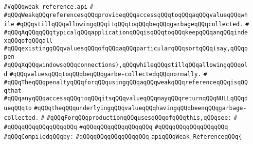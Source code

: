 \label{src/lib/std/src/nj/weak-reference.api}
\verb|##qQQqweak-reference.api|\newline
\verb|#|\newline
\verb|#qQQqWeakqQQqreferencesqQQqprovideqQQqaccessqQQqtoqQQqaqQQqvalueqQQqwhile|\newline
\verb|#qQQqstillqQQqallowingqQQqitqQQqtoqQQqbeqQQqgarbageqQQqcollected.|\newline
\verb|#|\newline
\verb|#qQQqAqQQqqQQqtypicalqQQqapplicationqQQqisqQQqtoqQQqkeepqQQqanqQQqindexqQQqofqQQqall|\newline
\verb|#qQQqexistingqQQqvaluesqQQqofqQQqaqQQqparticularqQQqsortqQQq(say,qQQqopen|\newline
\verb|#qQQqXqQQqwindowsqQQqconnections),qQQqwhileqQQqstillqQQqallowingqQQqold|\newline
\verb|#qQQqvaluesqQQqtoqQQqbeqQQqgarbe-collectedqQQqnormally.|\newline
\verb|#|\newline
\verb|#qQQqTheqQQqpenaltyqQQqforqQQqusingqQQqaqQQqweakqQQqreferenceqQQqisqQQqthat|\newline
\verb|#qQQqanyqQQqaccessqQQqtoqQQqitsqQQqvalueqQQqmayqQQqreturnqQQqNULLqQQqdueqQQqto|\newline
\verb|#qQQqtheqQQqunderlyingqQQqvalueqQQqhavingqQQqbeenqQQqgarbage-collected.|\newline
\verb|#|\newline
\verb|#qQQqForqQQqproductionqQQqusesqQQqofqQQqthis,qQQqsee:|\newline
\verb|#|\newline
\verb|#qQQqqQQqqQQqqQQqqQQq|\newline
\verb|#qQQqqQQqqQQqqQQqqQQq|\newline
\verb|#qQQqqQQqqQQqqQQqqQQq|\newline
\newline
\verb|#qQQqCompiledqQQqby:|\newline
\verb|#qQQqqQQqqQQqqQQqqQQq|\newline
\newline
\newline
\verb|apiqQQqWeak_ReferenceqQQq{|\newline
